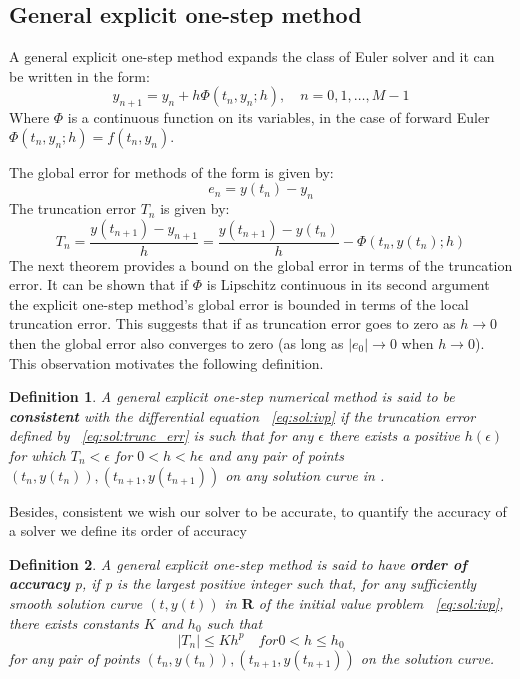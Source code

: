 \documentclass[11pt]{article}
\newtheorem{definition}{Definition}[section]
\begin{document}
    \subsection{General explicit one-step method}
    A general explicit one-step method expands the class of Euler solver and it can be written in the form:
    \begin{equation*}
        y_{n+1} = y_n + h \Phi(t_n, y_n ; h),\quad n=0,1,\dots, M-1
    \end{equation*}
    Where $\Phi$ is a continuous function on its variables, in the case of forward Euler $\Phi(t_n, y_n;h)= f(t_n,y_n).$

    The global error for methods of the form is given by:
    \begin{equation*}
        e_n = y(t_n) - y_n
    \end{equation*}
    The truncation error $T_n$ is given by:
    \begin{equation}
        \label{eq:sol:trunc_err}
        T_n = \frac{ y(t_{n+1}) - y_{n+1} }{ h } = \frac{ y(t_{n+1}) - y(t_n) }{ h } - \Phi(t_n, y(t_n);h)
    \end{equation}
    The next theorem provides a bound on the global error in terms of the truncation
    error.
    It can be shown that if $\Phi$ is Lipschitz continuous in its second argument the explicit one-step method's global
    error is bounded in terms of the local truncation error.
    This suggests that if as truncation error goes to zero as $h \to 0$ then the global error also converges to zero
    (as long as $|e_0| \to 0$ when $h \to 0$).
    This observation motivates the following definition.

    \begin{definition}
        A general explicit one-step numerical method is said to be \textbf{consistent} with the differential equation
        ~\eqref{eq:sol:ivp} if the truncation error defined by ~\ref{eq:sol:trunc_err} is such that for any $\epsilon$
        there exists a positive $h(\epsilon)$ for which $T_n < \epsilon$ for $0 < h< h{\epsilon}$ and any pair of points
        $(t_n, y(t_n)), (t_{n+1}, y(t_{n+1}) ) $ on any solution curve in .
    \end{definition}

    Besides, consistent we wish our solver to be accurate, to quantify the accuracy of a solver we define its order of
    accuracy

    \begin{definition}
        A general explicit one-step method is said to have \textbf{order of accuracy} p, if p is the largest positive
        integer such that, for any sufficiently smooth solution curve $(t, y(t))$ in $\pmb{R}$ of the initial value
        problem ~\eqref{eq:sol:ivp}, there exists constants $K$ and $h_0$ such that
        \begin{equation*}
            |T_n| \leq Kh^p \quad for 0<h\leq h_0
        \end{equation*}
        for any pair of points $(t_n, y(t_n)), (t_{n+1}, y(t_{n+1}) ) $ on the solution curve.
    \end{definition}
\end{document}
